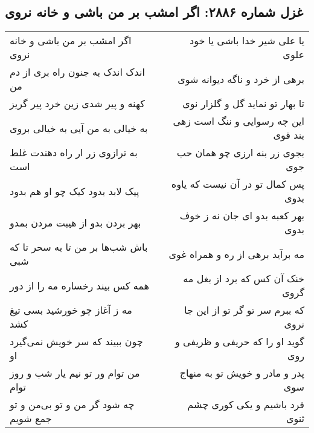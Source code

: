 \begin{center}
\section*{غزل شماره ۲۸۸۶: اگر امشب بر من باشی و خانه نروی}
\label{sec:2886}
\begin{longtable}{l p{0.5cm} r}
اگر امشب بر من باشی و خانه نروی
&&
یا علی شیر خدا باشی یا خود علوی
\\
اندک اندک به جنون راه بری از دم من
&&
برهی از خرد و ناگه دیوانه شوی
\\
کهنه و پیر شدی زین خرد پیر گریز
&&
تا بهار تو نماید گل و گلزار نوی
\\
به خیالی به من آیی به خیالی بروی
&&
این چه رسوایی و ننگ است زهی بند قوی
\\
به ترازوی زر ار راه دهندت غلط است
&&
بجوی زر بنه ارزی چو همان حب جوی
\\
پیک لابد بدود کیک چو او هم بدود
&&
پس کمال تو در آن نیست که یاوه بدوی
\\
بهر بردن بدو از هیبت مردن بمدو
&&
بهر کعبه بدو ای جان نه ز خوف بدوی
\\
باش شب‌ها بر من تا به سحر تا که شبی
&&
مه برآید برهی از ره و همراه غوی
\\
همه کس بیند رخساره مه را از دور
&&
خنک آن کس که برد از بغل مه گروی
\\
مه ز آغاز چو خورشید بسی تیغ کشد
&&
که ببرم سر تو گر تو از این جا نروی
\\
چون ببیند که سر خویش نمی‌گیرد او
&&
گوید او را که حریفی و ظریفی و روی
\\
من توام ور تو نیم یار شب و روز توام
&&
پدر و مادر و خویش تو به منهاج سوی
\\
چه شود گر من و تو بی‌من و تو جمع شویم
&&
فرد باشیم و یکی کوری چشم ثنوی
\\
\end{longtable}
\end{center}
